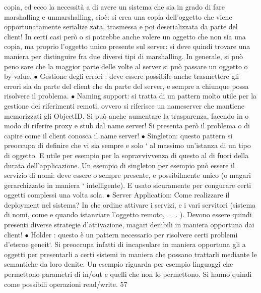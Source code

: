 copia, ed ecco la necessità
a
di avere un sistema che sia in grado di fare marshalling e unmarshalling,
cioè: si crea una copia dell'oggetto che viene opportunatamente serialize
zata, trasmessa e poi deserializzata da parte del client! In certi casi però
o
si potrebbe anche volere un oggetto che non sia una copia, ma proprio
l'oggetto unico presente sul server: si deve quindi trovare una maniera per
distinguire fra due diversi tipi di marshalling. In generale, si può peno
sare che la maggior parte delle volte al server si può passare un oggetto
o
by-value.
$\bullet$ Gestione degli errori : deve essere possibile anche trasmettere gli errori
sia da parte del client che da parte del server, e sempre a chiunque possa
risolvere il problema.
$\bullet$ Naming support: si tratta di un pattern molto utile per la gestione dei
riferimenti remoti, ovvero si riferisce un nameserver che mantiene memorizzati gli ObjectID. Si può anche aumentare la
trasparenza, facendo in
o
modo di riferire proxy e stub dal name server! Si presenta però il problema
o
di capire come il client conosca il name server!
$\bullet$ Singleton: questo pattern si preoccupa di definire che vi sia sempre e solo
`
al massimo un'istanza di un tipo di oggetto. E utile per esempio per
la sopravvivvenza di questo al di fuori della durata dell'applicazione. Un
esempio di singleton per esempio può essere il servizio di nomi: deve essere
o
sempre presente, e possibilmente unico (o magari gerarchizzato in maniera
`
intelligente). E usato sicuramente per congurare certi oggetti complessi
una volta sola.
$\bullet$ Server Application: Come realizzare il deployment nel sistema? In che
ordine attivare i servizi, e i vari servitori (sistema di nomi, come e quando
istanziare l'oggetto remoto, . . . ). Devono essere quindi presenti diverse
strategie d'attivazione, magari denibili in maniera opportuna dai client!
$\bullet$ Holder : questo è un pattern necessario per risolvere certi problemi d'eteroe
geneit`. Si preoccupa infatti di incapsulare in maniera opportuna gli
a
oggetti per presentarli a certi sistemi in maniera che possano trattarli
mediante le semantiche da loro denite. Un esempio riguarda per esempio linguaggi che permettono parametri di in/out e
quelli che non lo
permettono. Si hanno quindi come possibili operazioni read/write.
57
